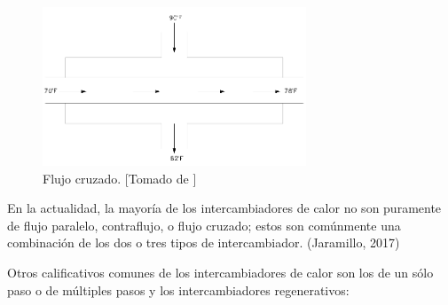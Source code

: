 \documentclass[12pt,letterpaper]{article}     %
\begin{document}
\begin{figure}[H]
\centering
\includegraphics[width=0.7\textwidth]{flujocruz.png}
\caption{Flujo cruzado. [Tomado de \cite{Jaramillo}]}
\label{fig:flujocruz}
\end{figure}

En la actualidad, la mayoría de los intercambiadores de calor no son puramente de flujo paralelo, contraflujo, o flujo cruzado; estos son comúnmente una combinación de los dos o tres tipos de intercambiador. (Jaramillo, 2017)

Otros calificativos comunes de los intercambiadores de calor son los de un sólo paso o de múltiples pasos y los intercambiadores regenerativos:






  
  

\end{document}
